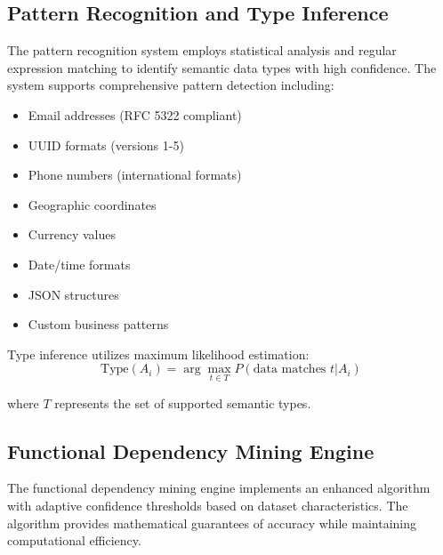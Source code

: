 \documentclass[acmsmall]{acmart}
\begin{document}
\subsection{Pattern Recognition and Type Inference}

The pattern recognition system employs statistical analysis and regular expression matching to identify semantic data types with high confidence. The system supports comprehensive pattern detection including:

\begin{itemize}
\item Email addresses (RFC 5322 compliant)
\item UUID formats (versions 1-5)
\item Phone numbers (international formats)
\item Geographic coordinates
\item Currency values
\item Date/time formats
\item JSON structures
\item Custom business patterns
\end{itemize}

Type inference utilizes maximum likelihood estimation:
\begin{equation}
\text{Type}(A_i) = \arg\max_{t \in T} P(\text{data matches } t | A_i)
\end{equation}

where $T$ represents the set of supported semantic types.

\subsection{Functional Dependency Mining Engine}

The functional dependency mining engine implements an enhanced algorithm with adaptive confidence thresholds based on dataset characteristics. The algorithm provides mathematical guarantees of accuracy while maintaining computational efficiency.
\end{document}
